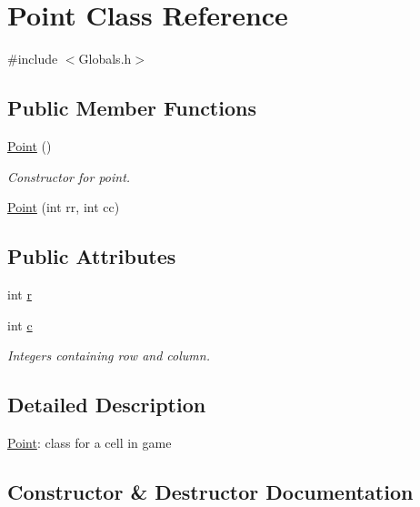 \hypertarget{class_point}{}\section{Point Class Reference}
\label{class_point}


{\ttfamily \#include $<$Globals.\+h$>$}

\subsection*{Public Member Functions}
\begin{DoxyCompactItemize}
\item 
\mbox{\hyperlink{class_point_ad92f2337b839a94ce97dcdb439b4325a}{Point}} ()
\begin{DoxyCompactList}\small\item\em Constructor for point. \end{DoxyCompactList}\item 
\mbox{\hyperlink{class_point_a960b60e4a0e680c368e8437f48f7d0fd}{Point}} (int rr, int cc)
\end{DoxyCompactItemize}
\subsection*{Public Attributes}
\begin{DoxyCompactItemize}
\item 
int \mbox{\hyperlink{class_point_a5eec80a5eba17a6cfc509a17125a5f17}{r}}
\item 
int \mbox{\hyperlink{class_point_a8277737deb586b2625d3106aa2fe32d6}{c}}
\begin{DoxyCompactList}\small\item\em Integers containing row and column. \end{DoxyCompactList}\end{DoxyCompactItemize}


\subsection{Detailed Description}
\mbox{\hyperlink{class_point}{Point}}\+: class for a cell in game 

\subsection{Constructor \& Destructor Documentation}
\mbox{\label{class_point_ad92f2337b839a94ce97dcdb439b4325a}} 
